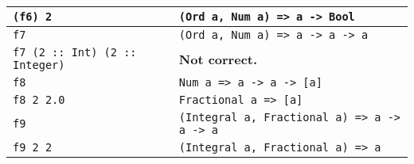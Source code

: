 \begin{tabularx}{\linewidth}{|X|X|}
  \lstinline|(f6) 2| & \lstinline|(Ord a, Num a) => a -> Bool|\\
  \hline
  \lstinline|f7| & \lstinline|(Ord a, Num a) => a -> a -> a|\\
  \hline
  \lstinline|f7 (2 :: Int) (2 :: Integer)| & \textbf{Not correct.}\\
  \hline
  \lstinline|f8| & \lstinline|Num a => a -> a -> [a]|\\
  \hline
  \lstinline|f8 2 2.0| & \lstinline|Fractional a => [a]|\\
  \hline
  \lstinline|f9| & \lstinline|(Integral a, Fractional a) => a -> a -> a|\\
  \hline
  \lstinline|f9 2 2| & \lstinline|(Integral a, Fractional a) => a|\\
  \hline
\end{tabularx}